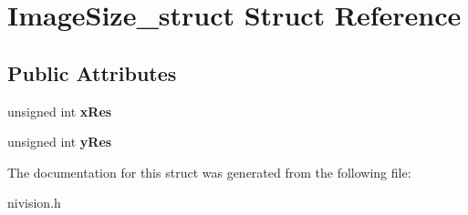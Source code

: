 \hypertarget{structImageSize__struct}{
\section{ImageSize\_\-struct Struct Reference}
\label{structImageSize__struct}
}
\subsection*{Public Attributes}
\begin{DoxyCompactItemize}
\item 
\hypertarget{structImageSize__struct_ab1f0c63965943feb1a903df432ba521a}{
unsigned int {\bfseries xRes}}
\label{structImageSize__struct_ab1f0c63965943feb1a903df432ba521a}

\item 
\hypertarget{structImageSize__struct_ab90e2e9bd94411f3c1e702255f6d06d4}{
unsigned int {\bfseries yRes}}
\label{structImageSize__struct_ab90e2e9bd94411f3c1e702255f6d06d4}

\end{DoxyCompactItemize}


The documentation for this struct was generated from the following file:\begin{DoxyCompactItemize}
\item 
nivision.h\end{DoxyCompactItemize}

